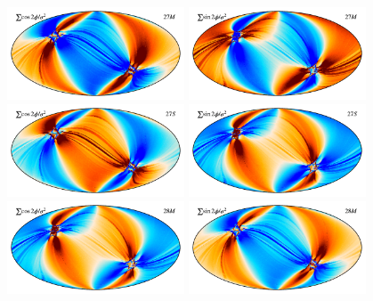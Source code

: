 \documentclass{aa}
\begin{document}
\begin{figure}
  \centering
  \includegraphics[width=0.47\textwidth]{figs/map_Q_polang27M.pdf}
  \includegraphics[width=0.47\textwidth]{figs/map_U_polang27M.pdf}\\
  \includegraphics[width=0.47\textwidth]{figs/map_Q_polang27S.pdf}
  \includegraphics[width=0.47\textwidth]{figs/map_U_polang27S.pdf}\\
  \includegraphics[width=0.47\textwidth]{figs/map_Q_polang28M.pdf}
  \includegraphics[width=0.47\textwidth]{figs/map_U_polang28M.pdf}\\

\end{figure}
\end{document}
